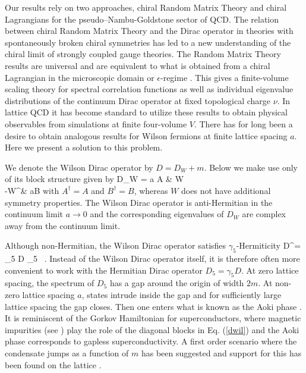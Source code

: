 \documentclass[aps,prl,twocolumn,superscriptaddress,preprintnumbers,floatfix,nofootinbib]{revtex4}
\begin{document}
Our results rely on two approaches, chiral
Random Matrix Theory and chiral Lagrangians
for the pseudo--Nambu-Goldstone sector of QCD.
The relation between chiral Random Matrix
Theory and the Dirac operator in theories with spontaneously
broken chiral symmetries \cite{SV} has led to a new 
understanding of the chiral limit of strongly coupled gauge theories.
The Random Matrix Theory results are universal \cite{ADMN} and are
equivalent  \cite{DOTV} to what is obtained from a 
chiral Lagrangian in the microscopic domain or $\epsilon$-regime
\cite{GL}. This gives a finite-volume scaling theory for spectral
correlation functions as well as individual eigenvalue distributions of the
continuum Dirac operator at fixed topological charge $\nu$.
In lattice QCD it has become standard to utilize these results
to obtain physical observables from simulations at finite four-volume $V$. 
There has  
for long been a desire to obtain analogous results for 
Wilson fermions at finite  lattice spacing
$a$. Here we present a solution to this problem.
  
We denote the Wilson Dirac operator by $D = D_W + m$. Below we make use
only of its block structure given by
\be
D_W = \bmat a A  & W \\ -W^\dagger & aB \emat
\label{dwil}
\ee
with $A^\dagger = A$ and $B^\dagger = B$, whereas $W$ does not have 
additional symmetry properties. The Wilson Dirac operator is 
anti-Hermitian in the continuum limit $a \to 0$ and the corresponding
eigenvalues of $D_W$ are complex away from the continuum limit. 

Although non-Hermitian, the Wilson Dirac operator satisfies 
$\gamma_5$-Hermiticity
\be
D^\dagger = \gamma_5 D \gamma_5 ~.
\label{g5Herm}
\ee
Instead of the Wilson Dirac operator itself, it is therefore often more
convenient to work with the Hermitian Dirac
operator $D_5 = \gamma_5D$. At zero lattice spacing,
the spectrum of $D_5$ has a gap around the origin of width 
 $2m$. At non-zero lattice spacing $a$, states intrude inside the
gap and for 
sufficiently large lattice spacing the gap
closes. Then one enters what is known as the Aoki phase \cite{Aoki}.
It is reminiscent of the Gorkov Hamiltonian for superconductors, where
magnetic impurities (see \cite{beenrev,Simons})
play the role of the diagonal blocks in Eq. (\ref{dwil}) and 
the Aoki phase corresponds to gapless superconductivity.
A first order scenario where the condensate jumps as a function of $m$
has been suggested \cite{SS} and support for this has been found on 
the lattice \cite{TM}.  
\end{document}
